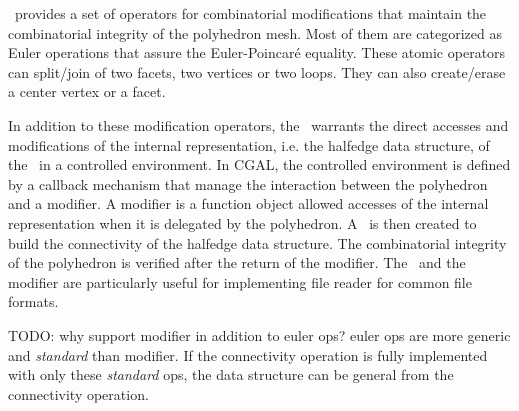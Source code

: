 \cgalpoly\ provides a set of operators for combinatorial 
modifications that maintain the combinatorial integrity
of the polyhedron mesh. Most of them are categorized as Euler operations
that assure the Euler-Poincar\'e equality.
These atomic operators can split/join of two facets, two vertices 
or two loops. They can also create/erase a center vertex or a facet.

In addition to these modification operators, 
the \polybuilder\ warrants the direct accesses and modifications
of the internal representation, i.e. the halfedge data structure, 
of the \poly\ in a controlled environment. In CGAL, the 
controlled environment is defined by a callback mechanism that
manage the interaction between the polyhedron and a modifier. 
A modifier is a function object allowed accesses 
of the internal representation when it is delegated by the 
polyhedron. A \polybuilder\ is then created to build  
the connectivity of the halfedge data structure.
The combinatorial integrity of the polyhedron is verified
after the return of the modifier. The \polybuilder\ and the
modifier are particularly useful for implementing file reader for 
common file formats.

TODO: why support modifier in addition to euler ops? euler ops are
more generic and \emph{standard} than modifier. If the connectivity operation
is fully implemented with only these \emph{standard} ops,
the data structure can be general from the connectivity operation.
